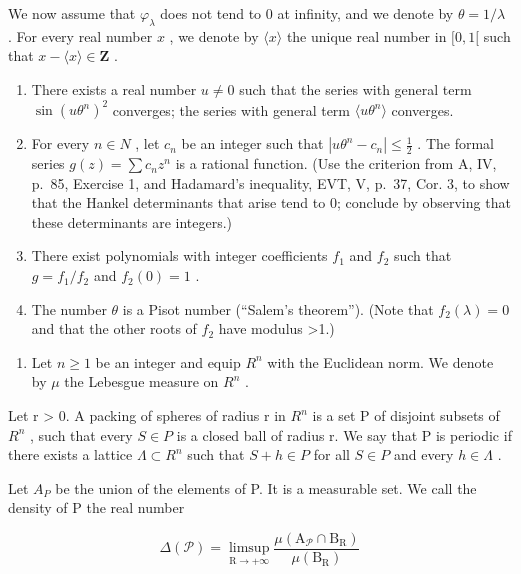 We now assume that \(\varphi_{\lambda}\) does not tend to 0 at infinity, and we denote by \(\theta = 1 / \lambda\) . For every real number \(x\) , we denote by \(\langle x\rangle\) the unique real number in \([0,1[\) such that \(x - \langle x\rangle \in \mathbf{Z}\) .

\begin{enumerate}
\def\labelenumi{\alph{enumi})}
\setcounter{enumi}{7}
\item
  There exists a real number \(u \neq 0\) such that the series with general term \(\sin(u\theta^{n})^{2}\) converges; the series with general term \(\langle u\theta^{n}\rangle\) converges.
\item
  For every \(n \in N\) , let \(c_{n}\) be an integer such that \(|u\theta^{n} - c_{n}| \leqslant \frac{1}{2}\) . The formal series \(g(z) = \sum c_{n}z^{n}\) is a rational function. (Use the criterion from A, IV, p.~85, Exercise 1, and Hadamard's inequality, EVT, V, p.~37, Cor. 3, to show that the Hankel determinants that arise tend to 0; conclude by observing that these determinants are integers.)
\item
  There exist polynomials with integer coefficients \(f_1\) and \(f_2\) such that \(g = f_1 / f_2\) and \(f_2(0) = 1\) .
\item
  The number \(\theta\) is a Pisot number (“Salem’s theorem”). (Note that \(f_{2}(\lambda)=0\) and that the other roots of \(f_{2}\) have modulus \textgreater1.)
\end{enumerate}

\begin{enumerate}
\def\labelenumi{\arabic{enumi})}
\setcounter{enumi}{58}
\tightlist
\item
  Let \(n \geqslant 1\) be an integer and equip \(R^{n}\) with the Euclidean norm. We denote by \(\mu\) the Lebesgue measure on \(R^{n}\) .
\end{enumerate}

Let r \textgreater{} 0. A packing of spheres of radius r in \(R^{n}\) is a set P of disjoint subsets of \(R^{n}\) , such that every \(S \in P\) is a closed ball of radius r. We say that P is periodic if there exists a lattice \(\Lambda \subset R^{n}\) such that \(S + h \in P\) for all \(S \in P\) and every \(h \in \Lambda\) .

Let \(A _{P}\) be the union of the elements of P. It is a measurable set. We call the density of P the real number

\[
\Delta (\mathcal {P}) = \limsup _ {\mathrm{R} \to + \infty} \frac {\mu (\mathrm{A} _ {\mathcal {P}} \cap \mathrm{B} _ {\mathrm{R}})}{\mu (\mathrm{B} _ {\mathrm{R}})}
\]

